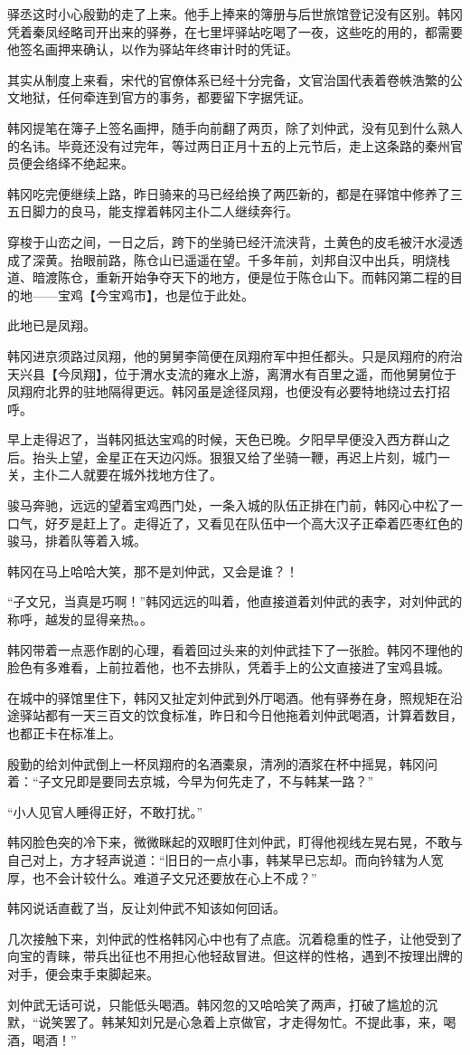 驿丞这时小心殷勤的走了上来。他手上捧来的簿册与后世旅馆登记没有区别。韩冈凭着秦凤经略司开出来的驿券，在七里坪驿站吃喝了一夜，这些吃的用的，都需要他签名画押来确认，以作为驿站年终审计时的凭证。

其实从制度上来看，宋代的官僚体系已经十分完备，文官治国代表着卷帙浩繁的公文地狱，任何牵连到官方的事务，都要留下字据凭证。

韩冈提笔在簿子上签名画押，随手向前翻了两页，除了刘仲武，没有见到什么熟人的名讳。毕竟还没有过完年，等过两日正月十五的上元节后，走上这条路的秦州官员便会络绎不绝起来。

韩冈吃完便继续上路，昨日骑来的马已经给换了两匹新的，都是在驿馆中修养了三五日脚力的良马，能支撑着韩冈主仆二人继续奔行。

穿梭于山峦之间，一日之后，跨下的坐骑已经汗流浃背，土黄色的皮毛被汗水浸透成了深黄。抬眼前路，陈仓山已遥遥在望。千多年前，刘邦自汉中出兵，明烧栈道、暗渡陈仓，重新开始争夺天下的地方，便是位于陈仓山下。而韩冈第二程的目的地——宝鸡【今宝鸡市】，也是位于此处。

此地已是凤翔。

韩冈进京须路过凤翔，他的舅舅李简便在凤翔府军中担任都头。只是凤翔府的府治天兴县【今凤翔】，位于渭水支流的雍水上游，离渭水有百里之遥，而他舅舅位于凤翔府北界的驻地隔得更远。韩冈虽是途径凤翔，也便没有必要特地绕过去打招呼。

早上走得迟了，当韩冈抵达宝鸡的时候，天色已晚。夕阳早早便没入西方群山之后。抬头上望，金星正在天边闪烁。狠狠又给了坐骑一鞭，再迟上片刻，城门一关，主仆二人就要在城外找地方住了。

骏马奔驰，远远的望着宝鸡西门处，一条入城的队伍正排在门前，韩冈心中松了一口气，好歹是赶上了。走得近了，又看见在队伍中一个高大汉子正牵着匹枣红色的骏马，排着队等着入城。

韩冈在马上哈哈大笑，那不是刘仲武，又会是谁？！

“子文兄，当真是巧啊！”韩冈远远的叫着，他直接道着刘仲武的表字，对刘仲武的称呼，越发的显得亲热。。

韩冈带着一点恶作剧的心理，看着回过头来的刘仲武挂下了一张脸。韩冈不理他的脸色有多难看，上前拉着他，也不去排队，凭着手上的公文直接进了宝鸡县城。

在城中的驿馆里住下，韩冈又扯定刘仲武到外厅喝酒。他有驿券在身，照规矩在沿途驿站都有一天三百文的饮食标准，昨日和今日他拖着刘仲武喝酒，计算着数目，也都正卡在标准上。

殷勤的给刘仲武倒上一杯凤翔府的名酒橐泉，清冽的酒浆在杯中摇晃，韩冈问着：“子文兄即是要同去京城，今早为何先走了，不与韩某一路？”

“小人见官人睡得正好，不敢打扰。”

韩冈脸色突的冷下来，微微眯起的双眼盯住刘仲武，盯得他视线左晃右晃，不敢与自己对上，方才轻声说道：“旧日的一点小事，韩某早已忘却。而向钤辖为人宽厚，也不会计较什么。难道子文兄还要放在心上不成？”

韩冈说话直截了当，反让刘仲武不知该如何回话。

几次接触下来，刘仲武的性格韩冈心中也有了点底。沉着稳重的性子，让他受到了向宝的青睐，带兵出征也不用担心他轻敌冒进。但这样的性格，遇到不按理出牌的对手，便会束手束脚起来。

刘仲武无话可说，只能低头喝酒。韩冈忽的又哈哈笑了两声，打破了尴尬的沉默，“说笑罢了。韩某知刘兄是心急着上京做官，才走得匆忙。不提此事，来，喝酒，喝酒！”

